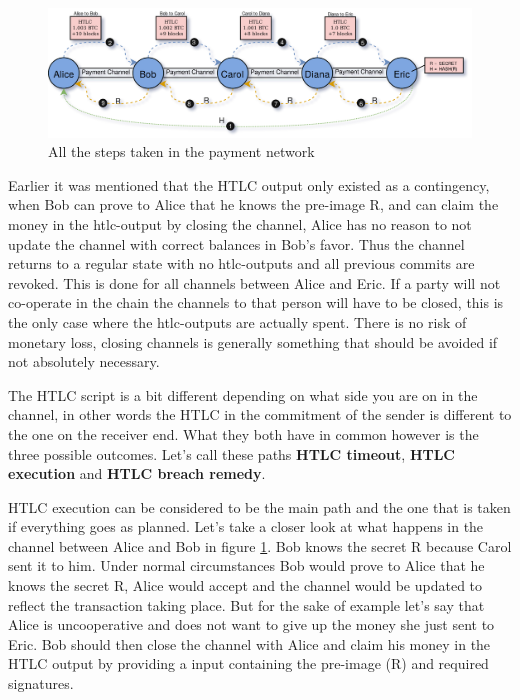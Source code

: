 \begin{figure}[H]
	\centering
	\includegraphics[width=1.1\textwidth]{background/images/ln_route_htlc.png}
	\caption{All the steps taken in the payment network}
	\label{fig:pc-route-final}
\end{figure}

Earlier it was mentioned that the HTLC output only existed as a contingency, when Bob can prove to Alice that he knows the pre-image R, and can claim the money in the htlc-output by closing the channel, Alice has no reason to not update the channel with correct balances in Bob's favor. Thus the channel returns to a regular state with no htlc-outputs and all previous commits are revoked. This is done for all channels between Alice and Eric. If a party will not co-operate in the chain the channels to that person will have to be closed, this is the only case where the htlc-outputs are actually spent. There is no risk of monetary loss, closing channels is generally something that should be avoided if not absolutely necessary.

The HTLC script is a bit different depending on what side you are on in the channel, in other words the HTLC in the commitment of the sender is different to the one on the receiver end. What they both have in common however is the three possible outcomes. Let's call these paths \textbf{HTLC timeout}, \textbf{HTLC execution} and \textbf{HTLC breach remedy}.

HTLC execution can be considered to be the main path and the one that is taken if everything goes as planned. Let's take a closer look at what happens in the channel between Alice and Bob in figure \ref{fig:pc-route-final}. Bob knows the secret R because Carol sent it to him. Under normal circumstances Bob would prove to Alice that he knows the secret R, Alice would accept and the channel would be updated to reflect the transaction taking place. But for the sake of example let's say that Alice is uncooperative and does not want to give up the money she just sent to Eric. 
Bob should then close the channel with Alice and claim his money in the HTLC output by providing a input containing the pre-image (R) and required signatures.

